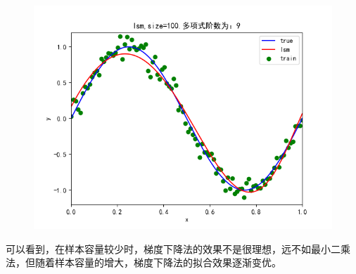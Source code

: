 \documentclass[lang=cn,a4paper,cite=authoryear]{elegantpaper}
\begin{document}
\begin{itemize}
\begin{figure}[H]
		\includegraphics[scale=0.5]{g100}
	\end{figure}
	
\end{itemize}
可以看到，在样本容量较少时，梯度下降法的效果不是很理想，远不如最小二乘法，但随着样本容量的增大，梯度下降法的拟合效果逐渐变优。
\end{document}
